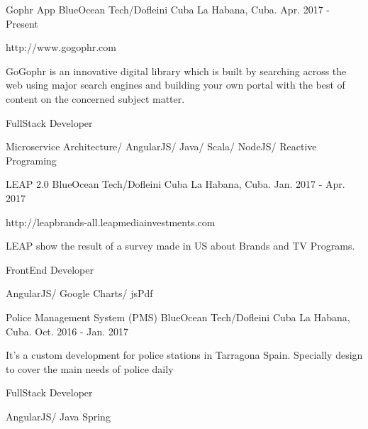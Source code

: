 


\begin{cventries}


\cventry
{Gophr App} %
{BlueOcean Tech/Dofleini Cuba} %
{La Habana, Cuba.} %
{Apr. 2017 - Present} %
{ %
\begin{cvitems}
\item {http://www.gogophr.com}
\item {GoGophr is an innovative digital library which is built by searching across the web using major search engines and building your own portal with the best of content on the concerned subject matter.}
\item {FullStack Developer}
\item {Microservice Architecture/ AngularJS/ Java/ Scala/ NodeJS/ Reactive Programing}
\end{cvitems}
}


\cventry
{LEAP 2.0} %
{BlueOcean Tech/Dofleini Cuba} %
{La Habana, Cuba.} %
{Jan. 2017 - Apr. 2017} %
{ %
\begin{cvitems}
\item {http://leapbrands-all.leapmediainvestments.com}
\item {LEAP show the result of a survey made in US about Brands and TV Programs.}
\item {FrontEnd Developer}
\item {AngularJS/ Google Charts/ jsPdf}
\end{cvitems}
}


\cventry
{Police Management System (PMS)} %
{BlueOcean Tech/Dofleini Cuba} %
{La Habana, Cuba.} %
{Oct. 2016 - Jan. 2017} %
{ %
\begin{cvitems}
\item {It’s a custom development for police stations in Tarragona Spain. Specially design to cover the main needs of police daily}
\item {FullStack Developer}
\item {AngularJS/ Java Spring}
\end{cvitems}
}


\end{cventries}
